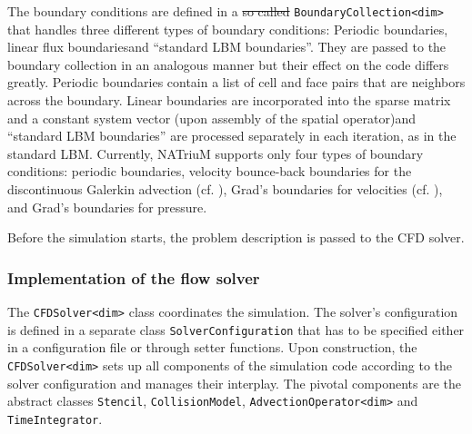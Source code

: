 \documentclass[1p, sort&compress]{elsarticle}
\providecommand{\DIFaddtex}[1]{{\protect\color{blue}\uwave{#1}}} %
\providecommand{\DIFdeltex}[1]{{\protect\color{red}\sout{#1}}}                      %
\providecommand{\DIFaddbegin}{} %
\providecommand{\DIFaddend}{} %
\providecommand{\DIFdelbegin}{} %
\providecommand{\DIFdelend}{} %
\providecommand{\DIFadd}[1]{\texorpdfstring{\DIFaddtex{#1}}{#1}} %
\providecommand{\DIFdel}[1]{\texorpdfstring{\DIFdeltex{#1}}{}} %
\newcommand{\DIFscaledelfig}{0.5}
\newlength{\DIFdelgraphicswidth} %
\newlength{\DIFdelgraphicsheight} %
\newcommand{\DIFaddincludegraphics}[2][]{{\color{blue}\fbox{\DIFOincludegraphics[#1]{#2}}}} %
\newcommand{\DIFdelincludegraphics}[2][]{%
\sbox{\DIFdelgraphicsbox}{\DIFOincludegraphics[#1]{#2}}%
\settoboxwidth{\DIFdelgraphicswidth}{\DIFdelgraphicsbox} %
\settoboxtotalheight{\DIFdelgraphicsheight}{\DIFdelgraphicsbox} %
\scalebox{\DIFscaledelfig}{%
\parbox[b]{\DIFdelgraphicswidth}{\usebox{\DIFdelgraphicsbox}\\[-\baselineskip] \rule{\DIFdelgraphicswidth}{0em}}\llap{\resizebox{\DIFdelgraphicswidth}{\DIFdelgraphicsheight}{%
\setlength{\unitlength}{\DIFdelgraphicswidth}%
\begin{picture}(1,1)%
\thicklines\linethickness{2pt} %
{\color[rgb]{1,0,0}\put(0,0){\framebox(1,1){}}}%
{\color[rgb]{1,0,0}\put(0,0){\line( 1,1){1}}}%
{\color[rgb]{1,0,0}\put(0,1){\line(1,-1){1}}}%
\end{picture}%
}\hspace*{3pt}}} %
} %
\DeclareRobustCommand{\DIFaddbegin}{\DIFOaddbegin \let\includegraphics\DIFaddincludegraphics} %
\DeclareRobustCommand{\DIFaddend}{\DIFOaddend \let\includegraphics\DIFOincludegraphics} %
\DeclareRobustCommand{\DIFdelbegin}{\DIFOdelbegin \let\includegraphics\DIFdelincludegraphics} %
\DeclareRobustCommand{\DIFdelend}{\DIFOaddend \let\includegraphics\DIFOincludegraphics} %
\begin{document}
The boundary conditions are defined in a \DIFdelbegin \DIFdel{so called }\DIFdelend \DIFaddbegin \DIFadd{so-called }\DIFaddend \texttt{BoundaryCollection<dim>} that handles three different types of boundary conditions: Periodic boundaries, linear flux boundaries\DIFaddbegin \DIFadd{, }\DIFaddend and ``standard LBM boundaries''. They are passed to the boundary collection in an analogous manner but their effect on the code differs greatly. 
Periodic boundaries contain a list of cell and face pairs that are neighbors across the boundary. 
Linear boundaries are incorporated into the sparse matrix and a constant system vector (upon assembly of the spatial operator)\DIFaddbegin \DIFadd{, }\DIFaddend and ``standard LBM boundaries'' are processed separately in each iteration, as in the standard LBM.
Currently, NATriuM supports only four types of boundary conditions: periodic boundaries, velocity bounce-back boundaries for the discontinuous Galerkin advection (cf. \cite{Min.2011}), Grad's boundaries for velocities (cf. \cite{Dorschner.2015}), and Grad's boundaries for pressure.

Before the simulation starts, the problem description is passed to the CFD solver.



\subsubsection{Implementation of the flow solver}
The \texttt{CFDSolver<dim>} class coordinates the simulation. The solver’s configuration is defined in a separate class \texttt{SolverConfiguration} that has to be specified either in a configuration file or through setter functions. Upon construction, the \texttt{CFDSolver<dim>} sets up all components of the simulation code according to the solver configuration and manages their interplay. The pivotal components are the abstract classes \texttt{Stencil}, \texttt{CollisionModel}, \texttt{AdvectionOperator<dim>} and \texttt{TimeIntegrator}.
\DIFdelbegin %
\end{document}

